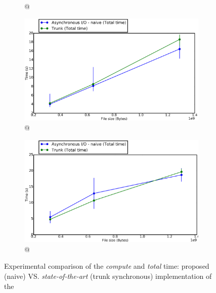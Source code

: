 \begin{figure}[!h]
\begin{subfigure}[b]{0.475\textwidth}
					\caption[]%
					{{\small \targetPlatformHpc \space @ \targetPlatformHpcFrequency}}    
					\label{fig:cubeRemapper_basicImplementation_compute_hpc}
				\end{subfigure}
				\hfill
				\begin{subfigure}[b]{0.475\textwidth}
					\centering
					\includegraphics[width=\textwidth]{charts/cubeRemapper_basicImplementation_total_workstation_8core.png}
					\caption[\targetPlatformLaptop \space @ \targetPlatformLaptopFrequency]
					{{\small \targetPlatformLaptop \space @ \targetPlatformLaptopFrequency}}
					\label{fig:cubeRemapper_basicImplementation_total_workstation_8core}
				\end{subfigure}
				\hfill
				\begin{subfigure}[b]{0.475\textwidth}
					\centering
					\includegraphics[width=\textwidth]{charts/cubeRemapper_basicImplementation_total_hpc.png}
					\caption[]%
					{{\small \targetPlatformHpc \space @ \targetPlatformHpcFrequency}}    
					\label{fig:cubeRemapper_basicImplementation_total_hpc}
				\end{subfigure}
				\caption{Experimental comparison of the \emph{compute} and \emph{total} time: proposed \emph{\notationaio\space} (naive) VS. \emph{state-of-the-art} (trunk synchronous) implementation of the \toolTargetSoftware}
				\label{fig:cubeRemapper_basicImplementation_compute_total}
			\end{figure}

